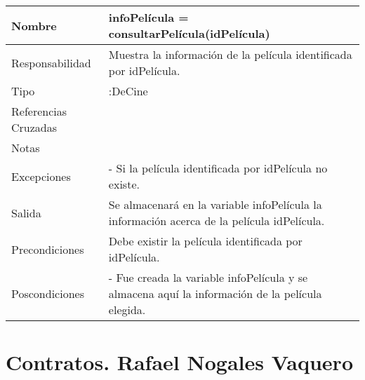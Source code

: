 \documentclass{article}
\begin{document}
\begin{table}[h]
\begin{tabular}{|l|l|l|l|l|l|}
\hline
\multicolumn{2}{|p{3cm}|}{Nombre} & \multicolumn{3}{p{8cm}|}{\textbf{infoPelícula = consultarPelícula(idPelícula)}}\\
\hline
\multicolumn{2}{|p{3cm}|}{Responsabilidad} & \multicolumn{4}{p{8cm}|}{Muestra la información de la película identificada por idPelícula.} \\
\hline
\multicolumn{2}{|p{3cm}|}{Tipo} & \multicolumn{4}{p{8cm}|}{:DeCine} \\
\hline
\multicolumn{2}{|p{3cm}|}{Referencias Cruzadas} & \multicolumn{4}{p{8cm}|}{} \\
\hline
\multicolumn{2}{|p{3cm}|}{Notas} & \multicolumn{4}{p{8cm}|}{} \\
\hline
\multicolumn{2}{|p{3cm}|}{Excepciones} & \multicolumn{4}{p{8cm}|}{-	Si la película identificada por idPelícula no existe.} \\
\hline
\multicolumn{2}{|p{3cm}|}{Salida} & \multicolumn{4}{p{8cm}|}{Se almacenará en la variable infoPelícula la información acerca de la película idPelícula.} \\
\hline
\multicolumn{2}{|p{3cm}|}{Precondiciones} & \multicolumn{4}{p{8cm}|}{Debe existir la película identificada por idPelícula.} \\
\hline
\multicolumn{2}{|p{3cm}|}{Poscondiciones} & \multicolumn{4}{p{8cm}|}{- Fue creada la variable infoPelícula y se almacena aquí la información de la película elegida.} \\
\hline
\end{tabular}
\end{table}
\pagebreak
\section{Contratos. Rafael Nogales Vaquero}
\clearpage
\end{document}
